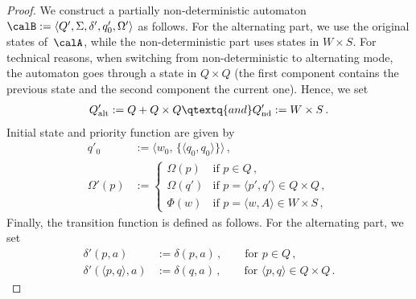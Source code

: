 \documentclass[10pt, fleqn]{scrartcl}
\newcommand*{\?}{\kern .08em}
\begin{document}
\begin{proof}
We construct a partially non-deterministic automaton
$\calB := \langle Q',\Sigma,\delta',q'_0,\Omega'\rangle$ as follows.
For the alternating part, we use the original states of~$\calA$, while
the non-deterministic part uses states in $W \times S$. For technical reasons,
when switching from non-deterministic to alternating mode, the automaton goes through
a state in $Q \times Q$ (the first component contains the previous state and the second
component the current one). Hence, we set
\begin{align*}
  Q'_{\mathrm{alt}} := Q + Q \times Q
  \qtextq{and}
  Q'_{\mathrm{nd}} := W \times S\,.
\end{align*}
Initial state and priority function are given by
\begin{align*}
  q'_0 &:= \bigl\langle w_0,\, \{\langle q_0,q_0\rangle\}\bigr\rangle\,, \\
  \Omega'(p) &:=
    \begin{cases}
      \Omega(p)  &\text{if } p \in Q\,, \\
      \Omega(q') &\text{if } p = \langle p',q'\rangle \in Q \times Q\,, \\
      \Phi(w)    &\text{if } p = \langle w,A\rangle \in W \times S\,,
    \end{cases}
\end{align*}
Finally, the transition function is defined as follows. For the alternating part, we set
\begin{align*}
  \delta'(p,a) &:= \delta(p,a)\,, \qquad\text{for } p \in Q\,, \\
  \delta'(\langle p,q\rangle,a) &:= \delta(q,a)\,,
    \qquad\text{for } \langle p,q\rangle \in Q \times Q\,.
\end{align*}


\end{proof}
\end{document}
